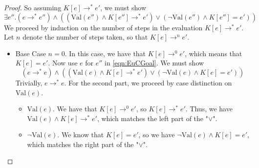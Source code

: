 \documentclass[twoside,11pt,openright]{report}
\newcommand{\expr}{e}
\newcommand{\elctx}{K}
\newcommand{\step}{\rightarrow}
\newcommand{\stepS}{\rightarrow^*}
\newcommand{\Val}[1]{\mathrm{Val}(#1)}
\begin{document}
\begin{proof}
  So assuming $\elctx[\expr] \stepS \expr'$, we must show
  \begin{equation}\label{eqn:EuCGoal}
    \exists \expr'' . (\expr \stepS \expr'') \land 
    \left( (\Val{\expr''} \land \elctx[\expr''] \stepS \expr') \lor
    (\neg \Val{\expr''} \land \elctx[\expr''] = \expr') \right)
  \end{equation}
  We proceed by induction on the number of steps in the evaluation $\elctx[\expr] \stepS \expr'$. Let $n$ denote the number of steps taken, so that $\elctx[\expr] \step^n \expr'$.
  \begin{itemize}
    \item Base Case $n = 0$. In this case, we have that $\elctx[\expr] \step^0 \expr'$, which means that $\elctx[\expr] = \expr'$. Now use $\expr$ for $\expr''$ in \ref{eqn:EuCGoal}. We must show
    \begin{equation*}
      (\expr \stepS \expr) \land 
      \left( (\Val{\expr} \land \elctx[\expr] \stepS \expr') \lor
      (\neg \Val{\expr} \land \elctx[\expr] = \expr') \right)
    \end{equation*}
    Trivially, $\expr \stepS \expr$. For the second part, we proceed by case distinction on $\Val{\expr}$.
    \begin{itemize}
      \item $\Val{\expr}$. We have that $\elctx[\expr] \step^0 \expr'$, so $\elctx[\expr] \stepS \expr'$. Thus, we have $\Val{\expr} \land \elctx[\expr] \stepS \expr'$, which matches the left part of the "$\lor$".
      \item $\neg \Val{\expr}$. We know that $\elctx[\expr] = \expr'$, so we have $\neg \Val{\expr} \land \elctx[\expr] = \expr'$, which matches the right part of the "$\lor$".
    \end{itemize}
    

\end{itemize}
\end{proof}
\end{document}
